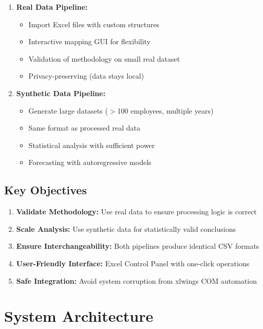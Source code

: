 \begin{enumerate}
    \item \textbf{Real Data Pipeline:}
    \begin{itemize}
        \item Import Excel files with custom structures
        \item Interactive mapping GUI for flexibility
        \item Validation of methodology on small real dataset
        \item Privacy-preserving (data stays local)
    \end{itemize}
    
    \item \textbf{Synthetic Data Pipeline:}
    \begin{itemize}
        \item Generate large datasets ($>$100 employees, multiple years)
        \item Same format as processed real data
        \item Statistical analysis with sufficient power
        \item Forecasting with autoregressive models
    \end{itemize}
\end{enumerate}

\subsection{Key Objectives}

\begin{enumerate}
    \item \textbf{Validate Methodology:} Use real data to ensure processing logic is correct
    \item \textbf{Scale Analysis:} Use synthetic data for statistically valid conclusions
    \item \textbf{Ensure Interchangeability:} Both pipelines produce identical CSV formats
    \item \textbf{User-Friendly Interface:} Excel Control Panel with one-click operations
    \item \textbf{Safe Integration:} Avoid system corruption from xlwings COM automation
\end{enumerate}

\section{System Architecture}

